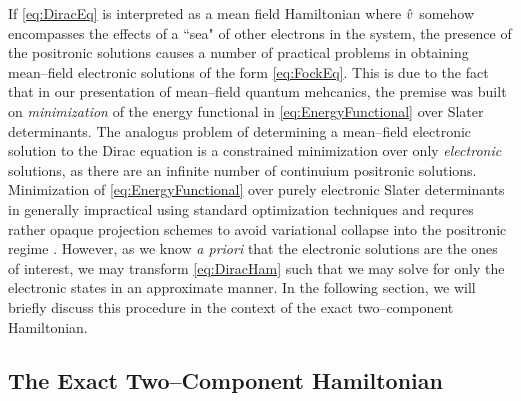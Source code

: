 If \cref{eq:DiracEq} is interpreted as a mean field Hamiltonian where $\hat{v}$ somehow encompasses
the effects of a ``sea" of other electrons in the system, the presence of the positronic solutions
causes a number of practical problems in obtaining mean--field electronic solutions of the form
\cref{eq:FockEq}. This is due to the fact that in our presentation of mean--field quantum mehcanics,
the premise was built on \emph{minimization} of the energy functional in \cref{eq:EnergyFunctional}
over Slater determinants. The analogus problem of determining a mean--field electronic solution
to the Dirac equation is a constrained minimization over only \emph{electronic} solutions, 
as there are an infinite number of continuium positronic solutions. Minimization of 
\cref{eq:EnergyFunctional} over purely electronic Slater determinants in generally impractical using standard 
optimization techniques and requres rather opaque projection schemes to avoid variational
collapse into the positronic regime . However, as we know \emph{a priori} that
the electronic solutions are the ones of interest, we may transform \cref{eq:DiracHam} such that
we may solve for only the electronic states in an approximate manner. In the following section,
we will briefly discuss this procedure in the context of the exact two--component Hamiltonian.

\subsection{The Exact Two--Component Hamiltonian}

